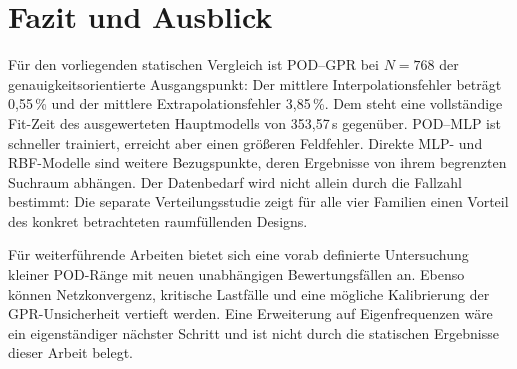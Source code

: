 \chapter{Fazit und Ausblick}
Für den vorliegenden statischen Vergleich ist POD--GPR bei $N=768$ der genauigkeitsorientierte Ausgangspunkt: Der mittlere Interpolationsfehler beträgt 0,55\,\% und der mittlere Extrapolationsfehler 3,85\,\%. Dem steht eine vollständige Fit-Zeit des ausgewerteten Hauptmodells von 353,57\,s gegenüber. POD--MLP ist schneller trainiert, erreicht aber einen größeren Feldfehler. Direkte MLP- und RBF-Modelle sind weitere Bezugspunkte, deren Ergebnisse von ihrem begrenzten Suchraum abhängen. Der Datenbedarf wird nicht allein durch die Fallzahl bestimmt: Die separate Verteilungsstudie zeigt für alle vier Familien einen Vorteil des konkret betrachteten raumfüllenden Designs.

Für weiterführende Arbeiten bietet sich eine vorab definierte Untersuchung kleiner POD-Ränge mit neuen unabhängigen Bewertungsfällen an. Ebenso können Netzkonvergenz, kritische Lastfälle und eine mögliche Kalibrierung der GPR-Unsicherheit vertieft werden. Eine Erweiterung auf Eigenfrequenzen wäre ein eigenständiger nächster Schritt und ist nicht durch die statischen Ergebnisse dieser Arbeit belegt.

